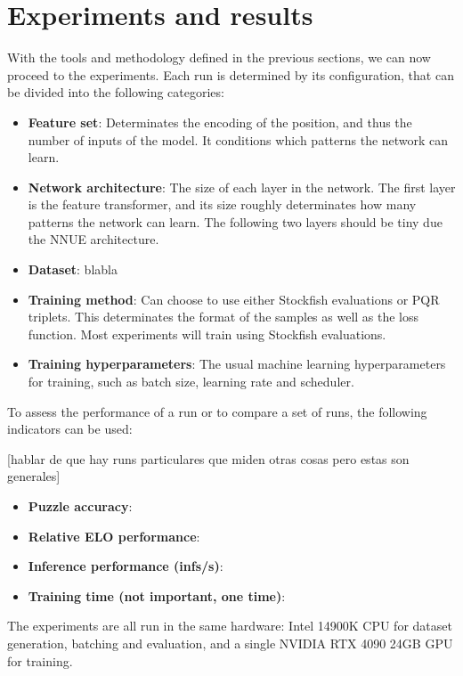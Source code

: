\section{Experiments and results}

With the tools and methodology defined in the previous sections, we can now proceed to the experiments. Each run is determined by its configuration, that can be divided into the following categories:

\begin{itemize}
\item \textbf{Feature set}: Determinates the encoding of the position, and thus the number of inputs of the model. It conditions which patterns the network can learn.

\item \textbf{Network architecture}: The size of each layer in the network. The first layer is the feature transformer, and its size roughly determinates how many patterns the network can learn. The following two layers should be tiny due the NNUE architecture.

\item \textbf{Dataset}: blabla

\item \textbf{Training method}: Can choose to use either Stockfish evaluations or PQR triplets. This determinates the format of the samples as well as the loss function. Most experiments will train using Stockfish evaluations.

\item \textbf{Training hyperparameters}: The usual machine learning hyperparameters for training, such as batch size, learning rate and scheduler.
\end{itemize}

To assess the performance of a run or to compare a set of runs, the following indicators can be used:

[hablar de que hay runs particulares que miden otras cosas pero estas son generales]

\begin{itemize}
\item \textbf{Puzzle accuracy}:
\item \textbf{Relative ELO performance}:
\item \textbf{Inference performance (infs/s)}:
\item \textbf{Training time (not important, one time)}:
\end{itemize}


The experiments are all run in the same hardware: Intel 14900K CPU for dataset generation, batching and evaluation, and a single NVIDIA RTX 4090 24GB GPU for training.

